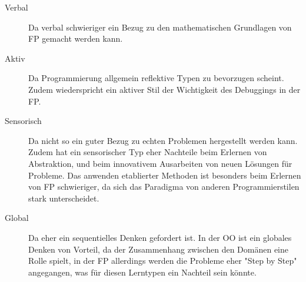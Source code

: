 \begin{description}
    \item[Verbal] Da verbal schwieriger ein Bezug zu den mathematischen Grundlagen von FP gemacht werden kann.
    \item[Aktiv] Da Programmierung allgemein reflektive Typen zu bevorzugen scheint. Zudem wiederspricht ein aktiver Stil der Wichtigkeit des Debuggings in der FP.
    \item[Sensorisch] Da nicht so ein guter Bezug zu echten Problemen hergestellt werden kann. Zudem hat ein sensorischer Typ eher Nachteile beim Erlernen von Abstraktion, und beim innovativem Ausarbeiten von neuen Lösungen für Probleme. Das anwenden etablierter Methoden ist besonders beim Erlernen von FP schwieriger, da sich das Paradigma von anderen Programmierstilen stark unterscheidet.
    \item[Global] Da eher ein sequentielles Denken gefordert ist. In der OO ist ein globales Denken von Vorteil, da der Zusammenhang zwischen den Domänen eine Rolle spielt, in der FP allerdings werden die Probleme eher "Step by Step" angegangen, was für diesen Lerntypen ein Nachteil sein könnte.
\end{description}